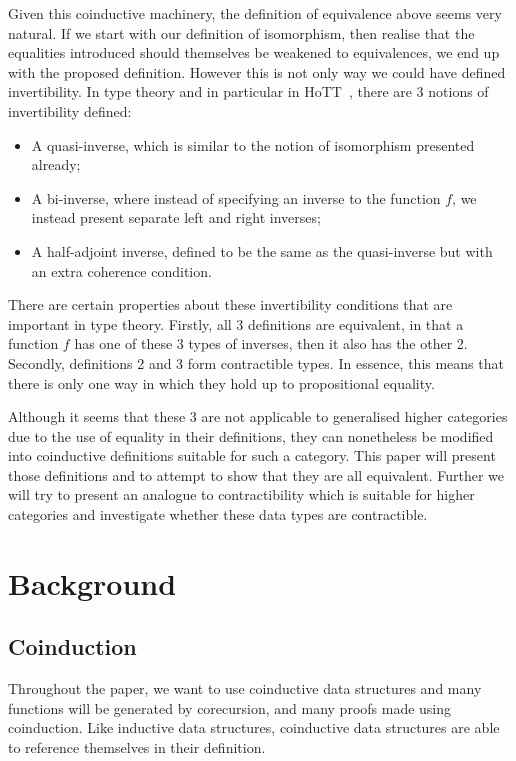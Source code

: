 \documentclass{article}
\theoremstyle{definition}
\theoremstyle{examplestyle}
\begin{document}
Given this coinductive machinery, the definition of equivalence above seems very natural. If we start with our definition of isomorphism, then realise that the equalities introduced should themselves be weakened to equivalences, we end up with the proposed definition. However this is not only way we could have defined invertibility. In type theory and in particular in HoTT~\cite{hottbook}, there are 3 notions of invertibility defined:

\begin{itemize}
\item A quasi-inverse, which is similar to the notion of isomorphism presented already;
\item A bi-inverse, where instead of specifying an inverse to the function \(f\), we instead present separate left and right inverses;
\item A half-adjoint inverse, defined to be the same as the quasi-inverse but with an extra coherence condition.
\end{itemize}

There are certain properties about these invertibility conditions that are important in type theory. Firstly, all 3 definitions are equivalent, in that a function \(f\) has one of these 3 types of inverses, then it also has the other 2. Secondly, definitions 2 and 3 form contractible types. In essence, this means that there is only one way in which they hold up to propositional equality.

Although it seems that these 3 are not applicable to generalised higher categories due to the use of equality in their definitions, they can nonetheless be modified into coinductive definitions suitable for such a category. This paper will present those definitions and to attempt to show that they are all equivalent. Further we will try to present an analogue to contractibility which is suitable for higher categories and investigate whether these data types are contractible.

\section{Background}\label{sec:background}

\subsection{Coinduction}\label{sec:coinduction}

Throughout the paper, we want to use coinductive data structures and many functions will be generated by corecursion, and many proofs made using coinduction. Like inductive data structures, coinductive data structures are able to reference themselves in their definition.
\end{document}
